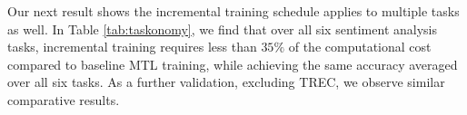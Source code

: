 
Our next result shows the incremental training schedule applies to multiple tasks as well.
In Table \ref{tab:taskonomy}, we find that over all six sentiment analysis tasks, incremental training requires less than $35\%$ of the computational cost compared to baseline MTL training, while achieving the same accuracy averaged over all six tasks.
As a further validation, excluding TREC, we observe similar comparative results.



